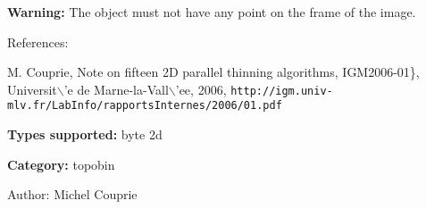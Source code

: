 {\bf Warning:} The object must not have any point on the frame of the image.

References:\par
 [COU05] M. Couprie, Note on fifteen 2D parallel thinning algorithms, IGM2006-01\}, Universit$\backslash$'e de Marne-la-Vall$\backslash$'ee, 2006, \tt{http://igm.univ-mlv.fr/Lab\-Info/rapports\-Internes/2006/01.pdf}\par


{\bf Types supported:} byte 2d

{\bf Category:} topobin

\begin{Desc}
\item[Author:]Michel Couprie \end{Desc}
